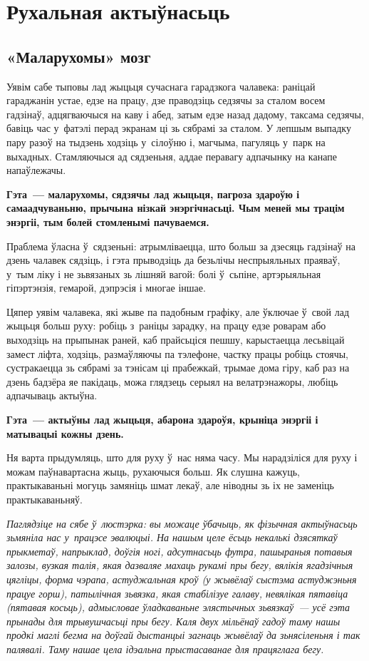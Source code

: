 \chapter{Рухальная актыўнасьць}

\section{«Маларухомы» мозг}

Уявім сабе тыповы лад жыцьця сучаснага гарадзкога чалавека: раніцай гараджанін устае, едзе на працу, дзе праводзіць седзячы за сталом восем гадзінаў, адцягваючыся на каву і абед, затым едзе назад дадому, таксама седзячы, бавіць час у~фатэлі перад экранам ці зь сябрамі за сталом. У лепшым выпадку пару разоў на тыдзень ходзіць у~сілоўню і, магчыма, пагуляць у~парк на выхадных. Стамляючыся ад сядзеньня, аддае перавагу адпачынку на канапе напаўлежачы. 

\textbf{Гэта~--- маларухомы, сядзячы лад жыцьця, пагроза здароўю і самаадчуваньню, прычына нізкай энэргічнасьці. Чым меней мы трацім энэргіі, тым болей стомленымі пачуваемся.}

Праблема ўласна ў~сядзеньні: атрымліваецца, што больш за дзесяць гадзінаў на дзень чалавек сядзіць, і гэта прыводзіць да безьлічы неспрыяльных праяваў, у~тым ліку і не зьвязаных зь лішняй вагой: болі ў~сьпіне, артэрыяльная гіпэртэнзія, гемарой, дэпрэсія і многае іншае.

Цяпер уявім чалавека, які жыве па падобным графіку, але ўключае ў~свой лад жыцьця больш руху: робіць з~раніцы зарадку, на працу едзе роварам або выходзіць на прыпынак раней, каб прайсьціся пешшу, карыстаецца лесьвіцай замест ліфта, ходзіць, размаўляючы па тэлефоне, частку працы робіць стоячы, сустракаецца зь сябрамі за тэнісам ці прабежкай, трымае дома гіру, каб раз на дзень бадзёра яе пакідаць, можа глядзець серыял на велатрэнажоры, любіць адпачываць актыўна. 

\textbf{Гэта~--- актыўны лад жыцьця, абарона здароўя, крыніца энэргіі і матывацыі кожны дзень.}

Ня варта прыдумляць, што для руху ў~нас няма часу. Мы нарадзіліся для руху і можам паўнавартасна жыць, рухаючыся больш. Як слушна кажуць, практыкаваньні могуць замяніць шмат лекаў, але ніводны зь іх не заменіць практыкаваньняў.

\emph{Паглядзіце на сябе ў~люстэрка: вы можаце ўбачыць, як фізычная актыўнасьць зьмяніла нас у~працэсе эвалюцыі. На нашым целе ёсьць некалькі дзясяткаў прыкметаў, напрыклад, доўгія ногі, адсутнасьць футра, пашыраныя потавыя залозы, вузкая талія, якая дазваляе махаць рукамі пры бегу, вялікія ягадзічныя цягліцы, форма чэрапа, астуджальная кроў (у жывёлаў сыстэма астуджэньня працуе горш), патылічная зьвязка, якая стабілізуе галаву, невялікая пятавіца (пятавая косьць), адмысловае ўладкаваньне элястычных зьвязкаў~--- усё гэта прынады для трывушчасьці пры бегу. Каля двух мільёнаў гадоў таму нашы продкі маглі бегма на доўгай дыстанцыі загнаць жывёлаў да зьнясіленьня і так палявалі. Таму нашае цела ідэальна прыстасаванае для працяглага бегу.}

